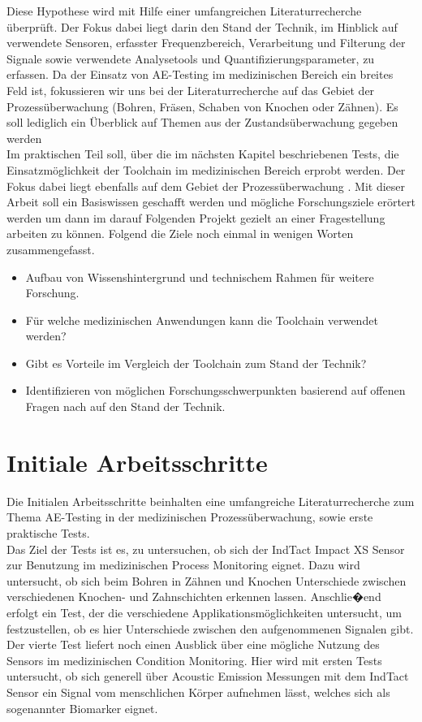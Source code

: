 \documentclass[twoside, 12pt, a4paper]{article}
\begin{document}
	Diese Hypothese wird mit Hilfe einer umfangreichen Literaturrecherche \"uberpr\"uft. Der Fokus dabei liegt darin den Stand der Technik, im Hinblick auf verwendete Sensoren, erfasster Frequenzbereich, Verarbeitung und Filterung der Signale sowie verwendete Analysetools und Quantifizierungsparameter, zu erfassen. Da der Einsatz von AE-Testing im medizinischen Bereich ein breites Feld ist, fokussieren wir uns bei der Literaturrecherche auf das Gebiet der Prozess\"uberwachung (Bohren, Fr\"asen, Schaben von Knochen oder Z\"ahnen). Es soll lediglich ein \"Uberblick auf Themen aus der Zustands\"uberwachung gegeben werden \\    
	Im praktischen Teil soll, \"uber die im n\"achsten Kapitel beschriebenen Tests, die Einsatzm\"oglichkeit der Toolchain im medizinischen Bereich erprobt werden. Der Fokus dabei liegt ebenfalls auf dem Gebiet der Prozess\"uberwachung . 
	Mit dieser Arbeit soll ein Basiswissen geschafft werden und m\"ogliche Forschungsziele er\"ortert werden um dann im darauf Folgenden Projekt gezielt an einer Fragestellung arbeiten zu k\"onnen. Folgend die Ziele noch einmal in wenigen Worten zusammengefasst.
	
	\begin{itemize}
		\item {Aufbau von Wissenshintergrund und technischem Rahmen f\"ur	weitere Forschung.}
		\item {F\"ur welche medizinischen Anwendungen kann die Toolchain verwendet werden?} 
		\item {Gibt es Vorteile im Vergleich der Toolchain zum Stand der Technik?} 
		\item {Identifizieren von m\"oglichen Forschungsschwerpunkten basierend auf offenen Fragen nach auf den Stand der Technik.}
	\end{itemize} 
	
	 
	
	
	
	\section{Initiale Arbeitsschritte}
	
Die Initialen Arbeitsschritte beinhalten eine umfangreiche Literaturrecherche zum Thema AE-Testing in der medizinischen Prozess\"uberwachung, sowie erste praktische Tests. \\


Das Ziel der Tests ist es, zu untersuchen, ob sich der IndTact Impact XS Sensor zur Benutzung im medizinischen Process Monitoring eignet. Dazu wird untersucht, ob sich beim Bohren in Z\"ahnen und Knochen Unterschiede zwischen verschiedenen Knochen- und Zahnschichten erkennen lassen. Anschlie�end erfolgt ein Test, der die verschiedene Applikationsm\"oglichkeiten untersucht, um festzustellen, ob es hier Unterschiede zwischen den aufgenommenen Signalen gibt. Der vierte Test liefert noch einen Ausblick \"uber eine m\"ogliche Nutzung des Sensors im medizinischen Condition Monitoring. Hier wird mit ersten Tests untersucht, ob sich generell \"uber Acoustic Emission Messungen mit dem IndTact Sensor ein Signal vom menschlichen K\"orper aufnehmen l\"asst, welches sich als sogenannter Biomarker eignet.  
\end{document}
